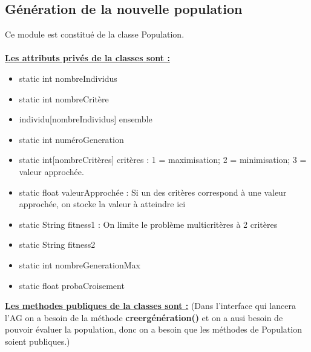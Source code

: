 \documentclass[a4paper,11pt]{article}
\begin{document}
		\subsection{Génération de la nouvelle population}
			Ce module est constitué de la classe Population.\\
			\\
			\underline{\bf Les attributs privés de la classes sont :}\\
				\begin{itemize}
				\item static int nombreIndividus
				\item static int nombreCritère
				\item individu[nombreIndividus] ensemble
				\item static int numéroGeneration
				\item static int[nombreCritères] critères : 1  = maximisation; 2 = minimisation; 3 = valeur approchée.
				\item static float valeurApprochée : Si un des critères correspond à une valeur approchée, on stocke la valeur à atteindre ici
				\item static String fitness1 : On limite le problème multicritères à 2 critères
				\item static String fitness2
				\item static int nombreGenerationMax
				\item static float probaCroisement\\
			\end{itemize}


			\underline{\bf Les methodes publiques de la classes sont :} (Dans l'interface qui lancera l’AG on a besoin de la méthode \textbf{creergénération()} et on a ausi besoin de pouvoir évaluer la population, donc on a besoin que les méthodes de Population soient publiques.)\\\\
\end{document}
